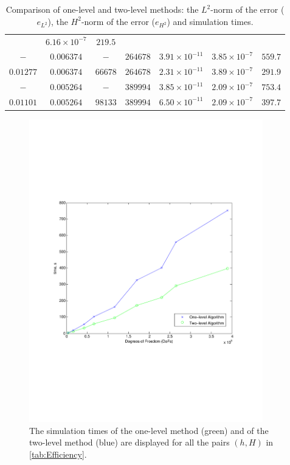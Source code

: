 \begin{table}
\begin{center}
{\begin{tabular}{|c|c|c|c|c|c|c|}
        & $6.16\times 10^{-7}$ & $219.5$ \\[0.2em]
      $-$         & $0.006374$  & $-$       & $264678$  & $3.91\times 10^{-11}$
      & $3.85\times 10^{-7}$ & $559.7$ \\[0.2em]
      $0.01277$   & $0.006374$  & $66678$   & $264678$  & $2.31\times 10^{-11}$
        & $3.89\times 10^{-7}$ & $291.9$\\[0.2em]
      $-$         & $0.005264$  & $-$       & $389994$  & $3.85\times 10^{-11}$
        & $2.09\times 10^{-7}$ & $753.4$ \\[0.2em]
      $0.01101$   & $0.005264$  & $98133$   & $389994$  & $6.50\times 10^{-11}$
        & $2.09\times 10^{-7}$ & $397.7$ \\[0.2em]
      \hline
    \end{tabular}}
  \end{center}
  \caption{Comparison of one-level and two-level methods: the $L^2$-norm of the
    error ($e_{L^2}$), the $H^2$-norm of the error ($e_{H^2}$) and simulation
    times.}
  \label{tab:Efficiency}
\end{table}

\begin{center}
  \begin{figure}
    \begin{center}
    \includegraphics[width=4in,natwidth=610,natheight=642]{performanceplot.pdf}
    \caption{The simulation times of the one-level method (green) and of the
      two-level method (blue) are displayed for all the pairs $(h,H)$ in
      \autoref{tab:Efficiency}.}
    \label{fig:Efficiency}
    \end{center}
  \end{figure}
\end{center}


